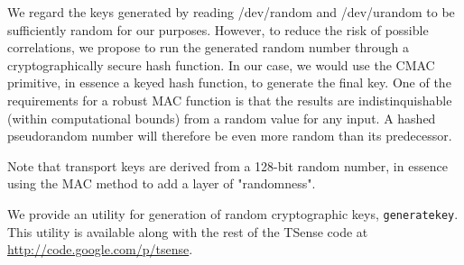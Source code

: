 We regard the keys generated by reading /dev/random and /dev/urandom to be sufficiently random for our purposes. However, to reduce the risk of possible correlations, we propose to run the generated random number through a cryptographically secure hash function. In our case, we would use the CMAC primitive, in essence a keyed hash function, to generate the final key. One of the requirements for a robust MAC function is that the results are indistinquishable (within computational bounds) from a random value for any input. A hashed pseudorandom number will therefore be even more random than its predecessor. 

Note that transport keys are derived from a 128-bit random number, in essence using the MAC method to add a layer of "randomness".

We provide an utility for generation of random cryptographic keys, \texttt{generatekey}. This utility is available along with the rest of the TSense code at \url{http://code.google.com/p/tsense}.

%
%
%
